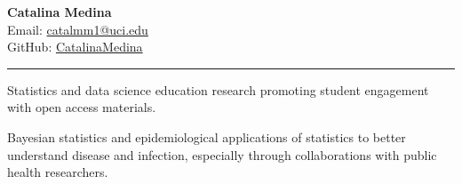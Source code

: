 \documentclass{article}
\makeatletter
\newcommand{\myname}{Catalina Medina}
\newcommand{\myemail}{\href{mailto:catalmm1@uci.edu}{catalmm1@uci.edu}}
\makeatother
\begin{document}
	\thispagestyle{empty}
	\phantom{.}\vspace{-2cm}
	\begin{center}
		{\huge \bf \myname}\\
		Email: \myemail\\
		GitHub: \href{https://github.com/CatalinaMedina}{CatalinaMedina}
	\end{center}
	
	\vspace{-4mm}
	\rule{\linewidth}{1pt}
	
	
	\begin{description}
		\vspace{-2mm}
		\item[Research Interests]\hspace*{.1in}
		
		Statistics and data science education research promoting student engagement with open access materials.
		
		Bayesian statistics and epidemiological applications of statistics to better understand disease and infection, especially through collaborations with public health researchers.
	\end{description}
	
\end{document}
